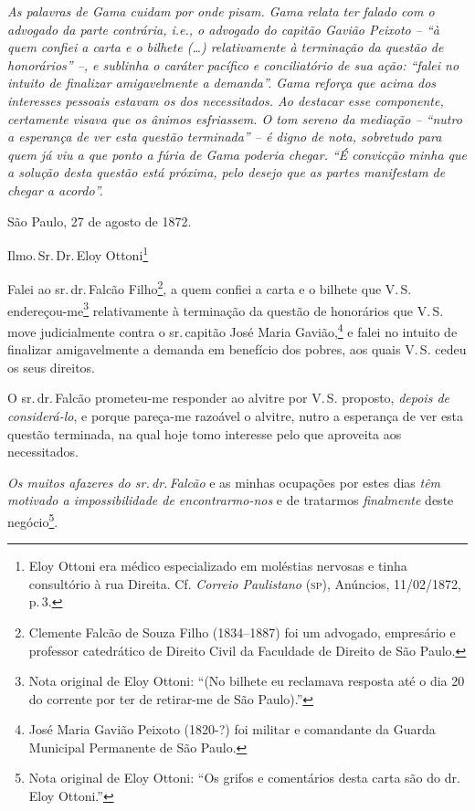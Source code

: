 \begin{didascalia}
\emph{As palavras de Gama cuidam por onde pisam. Gama relata ter falado
com o advogado da parte contrária, i.e., o advogado do capitão Gavião
Peixoto -- ``à quem confiei a carta e o bilhete (\ldots{}) relativamente à
terminação da questão de honorários'' --, e sublinha o caráter pacífico e
conciliatório de sua ação: ``falei no intuito de finalizar amigavelmente
a demanda''. Gama reforça que acima dos interesses pessoais estavam os
dos necessitados. Ao destacar esse componente, certamente visava que os
ânimos esfriassem. O tom sereno da mediação -- ``nutro a esperança de ver
esta questão terminada'' -- é digno de nota, sobretudo para quem já viu a
que ponto a fúria de Gama poderia chegar. ``É convicção minha que a
solução desta questão está próxima, pelo desejo que as partes manifestam
de chegar a acordo''.}
\end{didascalia}


São Paulo, 27 de agosto de 1872.

Ilmo.\,Sr.\,Dr.\,Eloy Ottoni\footnote{ Eloy Ottoni era médico
  especializado em moléstias nervosas e tinha consultório à rua Direita.
  Cf. \emph{Correio Paulistano} (\textsc{sp}), Anúncios, 11/02/1872, p.\,3.}

Falei ao sr.\,dr.\,Falcão Filho\footnote{ Clemente Falcão de Souza Filho
  (1834--1887) foi um advogado, empresário e professor catedrático de
  Direito Civil da Faculdade de Direito de São Paulo.}, a quem confiei a
carta e o bilhete que V.\,S. endereçou-me\footnote{ Nota original de
  Eloy Ottoni: ``(No bilhete eu reclamava resposta até o dia 20 do
  corrente por ter de retirar-me de São Paulo).''} relativamente à
terminação da questão de honorários que V.\,S. move judicialmente contra
o sr.\,capitão José Maria Gavião,\footnote{ José Maria Gavião Peixoto
  (1820-?) foi militar e comandante da Guarda Municipal Permanente de
  São Paulo.} e falei no intuito de finalizar amigavelmente a demanda em
benefício dos pobres, aos quais V.\,S. cedeu os seus direitos.

O sr.\,dr.\,Falcão prometeu-me responder ao alvitre por V.\,S. proposto,
\emph{depois de considerá-lo}, e porque pareça-me razoável o alvitre,
nutro a esperança de ver esta questão terminada, na qual hoje tomo
interesse pelo que aproveita aos necessitados.

\emph{Os muitos afazeres do sr.\,dr.\,Falcão} e as minhas ocupações por
estes dias \emph{têm motivado a impossibilidade de encontrarmo-nos} e de
tratarmos \emph{finalmente} deste negócio\footnote{ Nota original de
  Eloy Ottoni: ``Os grifos e comentários desta carta são do dr.\,Eloy
  Ottoni.''}.

